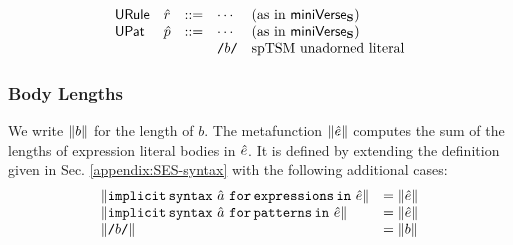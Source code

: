 \[\begin{array}{lllllll}
\mathsf{URule} & \hat{r} & ::= 
& \cdots & \text{(as in $\mathsf{miniVerse}_\textbf{S}$)}\\
\mathsf{UPat} & \hat{p} & ::= 
& \cdots & \text{(as in $\mathsf{miniVerse}_\textbf{S}$)}\\
&&& {\texttt{/}b\texttt{/}} & \text{spTSM unadorned literal}
\end{array}\]
\subsubsection{Body Lengths}
We write $\Vert b \Vert$ for the length of $b$. The metafunction $\Vert {\hat e} \Vert$ computes the sum of the lengths of expression literal bodies in ${\hat e}$. It is defined by extending the definition given in Sec. \ref{appendix:SES-syntax} with the following additional cases:
\[
\begin{array}{ll}
\Vert \texttt{implicit\,syntax}~\hat{a}~\texttt{for\,expressions\,in}~{\hat e} \Vert & = \Vert {\hat e} \Vert\\
\Vert \texttt{implicit\,syntax}~\hat{a}~\texttt{for\,patterns\,in}~{\hat e} \Vert & = \Vert {\hat e} \Vert\\
\Vert {\texttt{/}b\texttt{/}} \Vert & = \Vert b \Vert
\end{array}
\]

